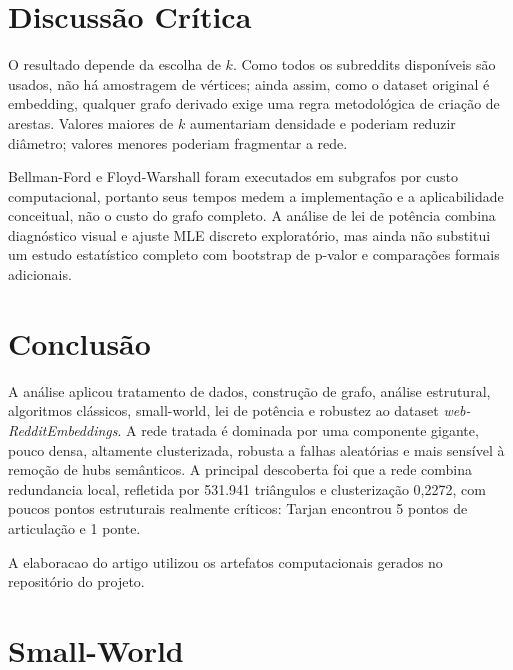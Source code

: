 \documentclass[sigconf]{webmedia}
\begin{document}
\clearpage

\section{Discussão Crítica}

O resultado depende da escolha de $k$. Como todos os subreddits
disponíveis são usados, não há amostragem de vértices; ainda assim, como
o dataset original é embedding, qualquer grafo derivado exige uma regra
metodológica de criação de arestas. Valores maiores de $k$ aumentariam
densidade e poderiam reduzir diâmetro; valores menores poderiam
fragmentar a rede.

Bellman-Ford e Floyd-Warshall foram executados em subgrafos por custo
computacional, portanto seus tempos medem a implementação e a
aplicabilidade conceitual, não o custo do grafo completo. A análise de
lei de potência combina diagnóstico visual e ajuste MLE discreto
exploratório, mas ainda não substitui um estudo estatístico completo com
bootstrap de p-valor e comparações formais adicionais.

\section{Conclusão}

A análise aplicou tratamento de dados, construção de grafo, análise
estrutural, algoritmos clássicos, small-world, lei de potência e robustez
ao dataset \textit{web-RedditEmbeddings}. A rede tratada é dominada por
uma componente gigante, pouco densa, altamente clusterizada, robusta a
falhas aleatórias e mais sensível à remoção de hubs semânticos. A
principal descoberta foi que a rede combina redundancia local, refletida
por 531.941 triângulos e clusterização 0,2272, com poucos pontos
estruturais realmente críticos: Tarjan encontrou 5 pontos de articulação
e 1 ponte.

\begin{acks}
A elaboracao do artigo utilizou os artefatos computacionais gerados no
repositório do projeto.
\end{acks}




\clearpage

\appendix

\section{Small-World}
\end{document}
